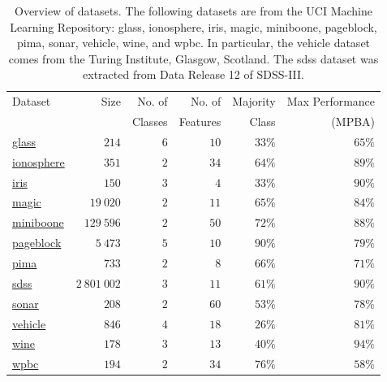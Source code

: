 \documentclass[fleqn,10pt,lineno]{wlpeerj} %
\begin{document}
\begin{table}[htbp]

	\caption {Overview of datasets. The following datasets are from the UCI
	Machine Learning Repository: glass, ionosphere, iris, magic, miniboone,
	pageblock, pima, sonar, vehicle, wine, and wpbc. In particular, the vehicle
	dataset comes from the Turing Institute, Glasgow, Scotland. The sdss
	dataset was extracted from Data Release 12 of SDSS-III.}
	\label{tab:datasets}

	\centering
	\begin{tabular}{lrrrrr}
		\toprule
		{Dataset}  & Size &  No. of   & No. of    & Majority & Max Performance  \\
		           &      &  Classes  & Features  &    Class & (MPBA) \\
		\midrule
        \href{https://archive.ics.uci.edu/ml/datasets/Glass+Identification}{glass}
        	& $214$ & $6$ & $10$ & $33\%$ & $65\%$ \\
		\href{https://archive.ics.uci.edu/ml/datasets/Ionosphere}{ionosphere}
			& $351$ & $2$ & $34$ & $64\%$ & $89\%$ \\
		\href{https://archive.ics.uci.edu/ml/datasets/Iris}{iris}
        	& $150$ & $3$ & $4$ & $33\%$ & $90\%$ \\
        \href{https://archive.ics.uci.edu/ml/datasets/MAGIC+Gamma+Telescope}{magic}
        	& $19~020$ & $2$ & $11$ & $65\%$ & $84\%$ \\
        \href{https://archive.ics.uci.edu/ml/datasets/MiniBooNE+particle+identification}{miniboone}
        	& $129~596$ & $2$ & $50$ & $72\%$ & $88\%$ \\
        \href{https://archive.ics.uci.edu/ml/datasets/Page+Blocks+Classification}{pageblock}
        	& $5~473$ & $5$ & $10$ & $90\%$ & $79\%$ \\
		\href{https://archive.ics.uci.edu/ml/datasets/Pima+Indians+Diabetes}{pima}
        	& $733$ & $2$ & $8$ & $66\%$ & $71\%$ \\
        \href{http://dx.doi.org/10.5281/zenodo.58500}{sdss}
        	& $2~801~002$ & $3$ & $11$ & $61\%$ & $90\%$ \\
		\href{https://archive.ics.uci.edu/ml/datasets/Connectionist+Bench+(Sonar,+Mines+vs.+Rocks)}{sonar}
        	& $208$ & $2$ & $60$ & $53\%$ & $78\%$ \\
        \href{https://archive.ics.uci.edu/ml/datasets/Statlog+(Vehicle+Silhouettes)}{vehicle}
			& $846$ & $4$ & $18$ & $26\%$ & $81\%$ \\
		\href{https://archive.ics.uci.edu/ml/datasets/Wine}{wine}
        	& $178$ & $3$ & $13$ & $40\%$ & $94\%$ \\
		\href{https://archive.ics.uci.edu/ml/datasets/Breast+Cancer+Wisconsin+(Prognostic)}{wpbc}
        	& $194$ & $2$ & $34$ & $76\%$ & $58\%$ \\
		\bottomrule
	\end{tabular}
\end{table}
\end{document}
